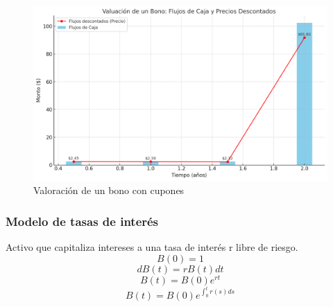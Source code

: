 \begin{frame}
    \begin{figure}[h]
       \centering
       \includegraphics[width=\textwidth]{img/cap1/bono_cupon.jpg}
       \caption{Valoración de un bono con cupones}
       \label{bono_cupon}
   \end{figure}
\end{frame}

\begin{frame}
    \frametitle{Modelo de tasas de interés}
    \begin{definition}
        Activo que capitaliza intereses a una tasa de interés r libre de riesgo.\\
        \begin{equation*}
            B(0) = 1 
        \end{equation*}
        \begin{equation*}
            dB(t) = rB(t)dt
        \end{equation*}
        \begin{equation*}
            B(t) = B(0)e^{rt}
        \end{equation*}
        \begin{equation*}
            B(t) = B(0)e^{\int_0^t r(s)ds}
        \end{equation*}
    \end{definition}
\end{frame}


